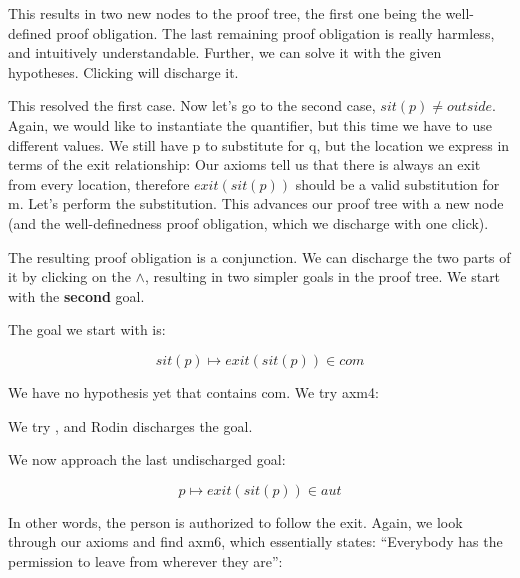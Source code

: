 This results in two new nodes to the proof tree, the first one being the well-defined proof obligation.  The last remaining proof obligation is really harmless, and intuitively understandable. Further, we can solve it with the given hypotheses.  Clicking  will discharge it.

This resolved the first case.  Now let's go to the second case, $sit(p) \neq outside$.  Again, we would like to instantiate the quantifier, but this time we have to use different values.  We still have p to substitute for q, but the location we express in terms of the exit relationship: Our axioms tell us that there is always an exit from every location, therefore $exit(sit(p))$ should be a valid substitution for m. Let's perform the substitution.  This advances our proof tree with a new node (and the well-definedness proof obligation, which we discharge with one click).

The resulting proof obligation is a conjunction.  We can discharge the two parts of it by clicking on the $\land$, resulting in two simpler goals in the proof tree.  We start with the \textbf{second} goal.


The goal we start with is:

$$ sit(p) \mapsto exit(sit(p)) \in com $$

We have no hypothesis yet that contains com.  We try \textsf{axm4}:


We try  , and Rodin discharges the goal.

We now approach the last undischarged goal:

$$ p \mapsto exit(sit(p)) \in aut $$

In other words, the person is authorized to follow the exit.  Again, we look through our axioms and find \textsf{axm6}, which essentially states: ``Everybody has the permission to leave from wherever they are'':


